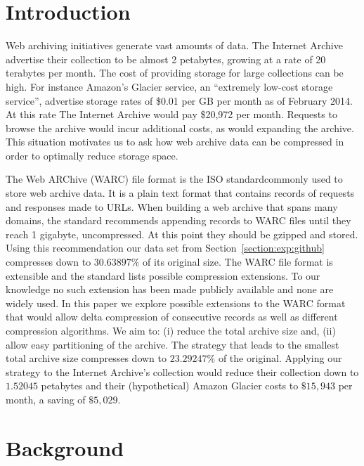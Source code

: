 \documentclass[11pt, twocolumn]{article}
\def \gzipcompressionpct {30.63897}
\def \beststrategypct {23.29247}
\def \newiasize {1.52045}
\def \newglaciercost {15,943}
\def \newglaciersavings {5,029}
\begin{document}
\section{Introduction}

  Web archiving initiatives generate vast amounts of data. The Internet Archive advertise their collection to be almost 2 petabytes, growing at a rate of 20 terabytes per month\footnotemark. The cost of providing storage for large collections can be high. For instance Amazon's Glacier service, an ``extremely low-cost storage service'', advertise storage rates of \$0.01 per GB per month as of February 2014. At this rate The Internet Archive would pay \$20,972 per month. Requests to browse the archive would incur additional costs, as would expanding the archive. This situation motivates us to ask how web archive data can be compressed in order to optimally reduce storage space.

  The Web ARChive (WARC) file format is the ISO standard\footnotemark commonly used to store web archive data. It is a plain text format that contains records of requests and responses made to URLs. When building a web archive that spans many domains, the standard recommends appending records to WARC files until they reach 1 gigabyte, uncompressed. At this point they should be gzipped and stored. Using this recommendation our data set from Section~\ref{section:exp:github} compresses down to $\gzipcompressionpct\%$ of its original size. The WARC file format is extensible and the standard lists possible compression extensions. To our knowledge no such extension has been made publicly available and none are widely used. In this paper we explore possible extensions to the WARC format that would allow delta compression of consecutive records as well as different compression algorithms. We aim to: (i) reduce the total archive size and, (ii) allow easy partitioning of the archive. The strategy that leads to the smallest total archive size compresses down to $\beststrategypct\%$ of the original. Applying our strategy to the Internet Archive's collection would reduce their collection down to $\newiasize$ petabytes and their (hypothetical) Amazon Glacier costs to $\$\newglaciercost$ per month, a saving of $\$\newglaciersavings$.


\section{Background}
\end{document}
